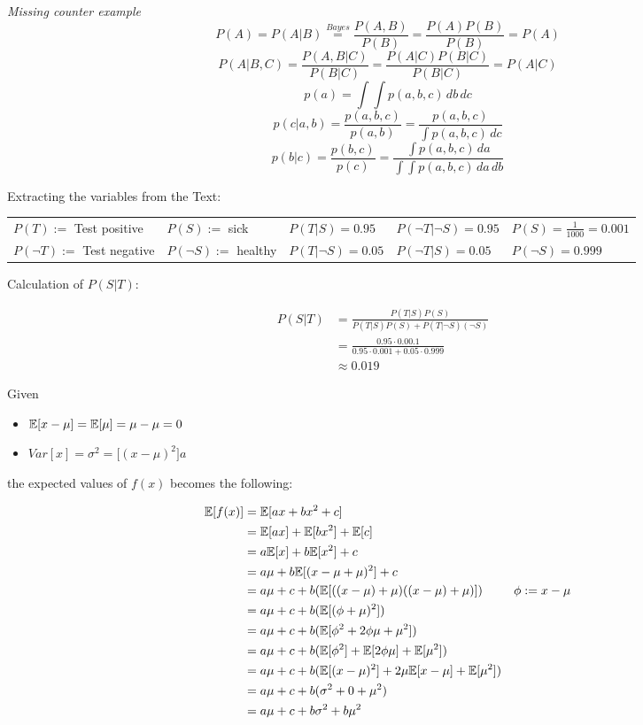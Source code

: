 %
\textit{Missing counter example}
%
\[ P(A) = P(A|B) \overset{Bayes}{=} \frac{P(A,B)}{P(B)} = \frac{P(A)P(B)}{P(B)} = P(A) \]
\[P(A|B,C) = \frac{P(A,B|C)}{P(B|C)} = \frac{P(A|C)P(B|C)}{P(B|C)} = P(A|C) \]
%
%
\[ p(a) = \int \int p(a,b,c)\,db\,dc \]
\[ p(c|a,b) = \frac{p(a,b,c)}{p(a,b)} = \frac{p(a,b,c)}{\int p(a,b,c)\, dc} \]
\[ p(b|c) = \frac{p(b,c)}{p(c)} = \frac{\int p(a,b,c) \, da}{\int \int p(a,b,c)\,da\,db} \]
%
%
\begin{flushleft}
Extracting the variables from the Text:
\end{flushleft}
\begin{table}[h]
\begin{tabular}{lllll}
  $P(T) :=$ Test positive & $P(S) :=$ sick & $P(T|S) = 0.95$ & $P(\neg T|\neg S) = 0.95$ & $P(S) = \frac{1}{1000} = 0.001$ \\
  $P(\neg T) :=$ Test negative & $P(\neg S) :=$ healthy & $P(T|\neg S) = 0.05$ & $P(\neg T|S) = 0.05$ & $P(\neg S) = 0.999$
\end{tabular}
\end{table}
\begin{flushleft}
Calculation of $P(S|T)$:
\end{flushleft}
\begin{align*}
  P(S|T) &= \frac{P(T|S)P(S)}{P(T|S)P(S) + P(T|\neg S)(\neg S)} &\\
  &= \frac{0.95 \cdot 0.00.1}{0.95 \cdot 0.001 + 0.05 \cdot 0.999} &\\
  &\approx 0.019 &
\end{align*}
%
%
\begin{flushleft}
Given 
\begin{itemize}
  \item $\mathbb{E}[x-\mu] = \mathbb{E}[\mu] = \mu - \mu = 0$
  \item $Var[x] = \sigma^2 = \mathbb[(x-\mu)^2]a$
\end{itemize}
the expected values of $f(x)$ becomes the following:
\end{flushleft}
\begin{align}
  \mathbb{E}[f(x)] &= \mathbb{E}[ax + bx^2 + c] &\\
  &= \mathbb{E}[ax] + \mathbb{E}[bx^2] + \mathbb{E}[c] &\\
  &= a \mathbb{E}[x] + b \mathbb{E}[x^2] + c &\\
  &= a\mu + b \mathbb{E}[(x-\mu+\mu)^2] + c &\\
  &= a\mu + c + b(\mathbb{E}[((x-\mu) + \mu) ((x-\mu)+\mu)]) &\phi := x-\mu \\
  &= a\mu + c + b(\mathbb{E}[(\phi + \mu)^2]) \\
  &= a\mu + c + b(\mathbb{E}[\phi^2 + 2\phi\mu +\mu^2]) &\\
  &= a\mu + c + b(\mathbb{E}[\phi^2] + \mathbb{E}[2\phi\mu] + \mathbb{E}[\mu^2]) &\\
  &= a\mu + c + b(\mathbb{E}[(x-\mu)^2] + 2\mu \mathbb{E}[x-\mu] + \mathbb{E}[\mu^2]) &\\
  &= a\mu + c + b(\sigma^2 + 0 + \mu^2) &\\
  &= a\mu + c + b\sigma^2 + b\mu^2 &
\end{align}
